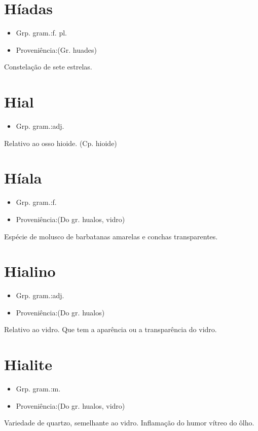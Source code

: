 \documentclass{article}
\begin{document}
\section{Híadas}
\begin{itemize}
\item {Grp. gram.:f. pl.}
\end{itemize}
\begin{itemize}
\item {Proveniência:(Gr. \textunderscore huades\textunderscore )}
\end{itemize}
Constelação de sete estrelas.
\section{Hial}
\begin{itemize}
\item {Grp. gram.:adj.}
\end{itemize}
Relativo ao osso hioide.
(Cp. \textunderscore hioide\textunderscore )
\section{Híala}
\begin{itemize}
\item {Grp. gram.:f.}
\end{itemize}
\begin{itemize}
\item {Proveniência:(Do gr. \textunderscore hualos\textunderscore , vidro)}
\end{itemize}
Espécie de molusco de barbatanas amarelas e conchas transparentes.
\section{Hialino}
\begin{itemize}
\item {Grp. gram.:adj.}
\end{itemize}
\begin{itemize}
\item {Proveniência:(Do gr. \textunderscore hualos\textunderscore )}
\end{itemize}
Relativo ao vidro.
Que tem a aparência ou a transparência do vidro.
\section{Hialite}
\begin{itemize}
\item {Grp. gram.:m.}
\end{itemize}
\begin{itemize}
\item {Proveniência:(Do gr. \textunderscore hualos\textunderscore , vidro)}
\end{itemize}
Variedade de quartzo, semelhante ao vidro.
Inflamação do humor vítreo do ôlho.
\end{document}
